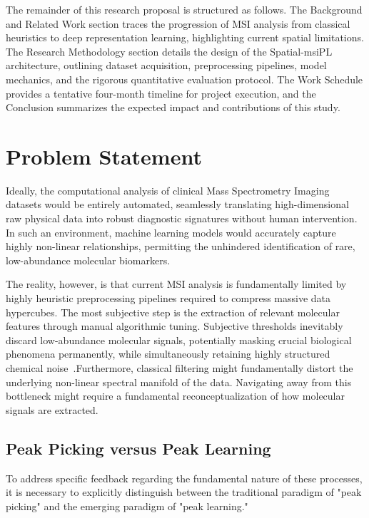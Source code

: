 \documentclass[
12pt, %
oneside, %
english, %
onehalfspacing, %
nolistspacing, %
headsepline, %
]{MastersDoctoralThesis} %
\begin{document}
The remainder of this research proposal is structured as follows. The Background and Related Work section traces the progression of MSI analysis from classical heuristics to deep representation learning, highlighting current spatial limitations. The Research Methodology section details the design of the Spatial-msiPL architecture, outlining dataset acquisition, preprocessing pipelines, model mechanics, and the rigorous quantitative evaluation protocol. The Work Schedule provides a tentative four-month timeline for project execution, and the Conclusion summarizes the expected impact and contributions of this study.

\section{Problem Statement}

Ideally, the computational analysis of clinical Mass Spectrometry Imaging datasets would be entirely automated, seamlessly translating high-dimensional raw physical data into robust diagnostic signatures without human intervention. In such an environment, machine learning models would accurately capture highly non-linear relationships, permitting the unhindered identification of rare, low-abundance molecular biomarkers.

The reality, however, is that current MSI analysis is fundamentally limited by highly heuristic preprocessing pipelines required to compress massive data hypercubes. The most subjective step is the extraction of relevant molecular features through manual algorithmic tuning.  Subjective thresholds inevitably discard low-abundance molecular signals, potentially masking crucial biological phenomena permanently, while simultaneously retaining highly structured chemical noise~\citep{lieb2020sparse}.Furthermore, classical filtering might fundamentally distort the underlying non-linear spectral manifold of the data. Navigating away from this bottleneck might require a fundamental reconceptualization of how molecular signals are extracted. \citep{abdelmoula2021peak}

\subsection{Peak Picking versus Peak Learning}

To address specific feedback regarding the fundamental nature of these processes, it is necessary to explicitly distinguish between the traditional paradigm of "peak picking" and the emerging paradigm of "peak learning."
\end{document}
